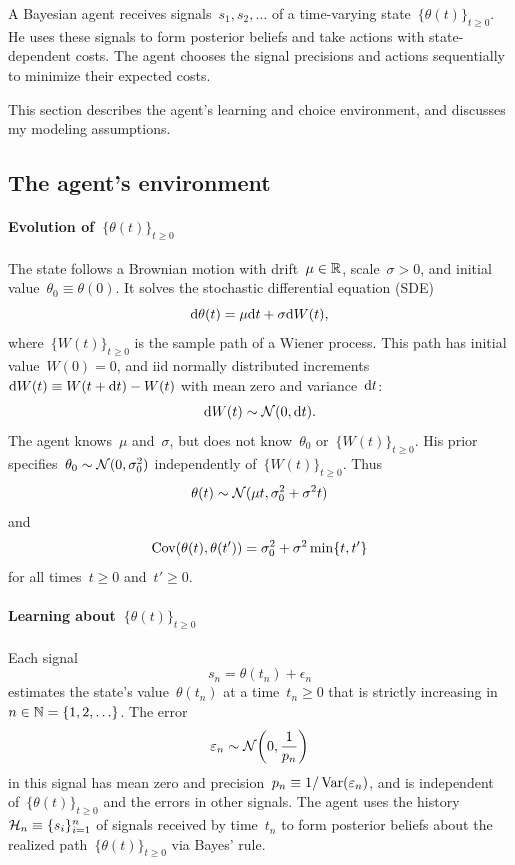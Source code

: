 \documentclass[11pt,oneside]{article}
\begin{document}
A Bayesian agent receives signals~$s_1,s_2,\ldots$ of a time-varying state~$\{\theta(t)\}_{t\ge0}$.
He uses these signals to form posterior beliefs and take actions with state-dependent costs.
The agent chooses the signal precisions and actions sequentially to minimize their expected costs.

This section describes the agent's learning and choice environment, and discusses my modeling assumptions.

\subsection{The agent's environment}

\paragraph{Evolution of~$\{\theta(t)\}_{t\ge0}$}

The state follows a Brownian motion with drift~$\mu\in\mathbb{R}$, scale~$\sigma>0$, and initial value~$\theta_0\equiv\theta(0)$.
It solves the stochastic differential equation (SDE)
%
\begin{equation}
    \mathrm{d} \theta(t)=\mu\mathrm{d} t+\sigma\mathrm{d} W(t), \label{eq:sde-brownian}
\end{equation}
%
where~$\{W(t)\}_{t\ge0}$ is the sample path of a Wiener process.
This path has initial value~$W(0)=0$, and iid normally distributed increments~$\mathrm{d} W(t)\equiv W(t+\mathrm{d} t)-W(t)$ with mean zero and variance~$\mathrm{d} t$:
\[ \mathrm{d} W(t)\sim\mathcal{N}(0,\mathrm{d} t). \]
The agent knows~$\mu$ and~$\sigma$, but does not know~$\theta_0$ or~$\{W(t)\}_{t\ge0}$.
His prior specifies~$\theta_0\sim\mathcal{N}(0,\sigma_0^2)$ independently of~$\{W(t)\}_{t\ge0}$.
Thus
\[ \theta(t)\sim\mathcal{N}(\mu t,\sigma_0^2+\sigma^2t) \]
and
%
\begin{equation}
    \operatorname{Cov}(\theta(t),\theta(t'))=\sigma_0^2+\sigma^2\min\{t,t'\} \label{eq:covariance-brownian}
\end{equation}
%
for all times~$t\ge0$ and~$t'\ge0$.

\paragraph{Learning about~$\{\theta(t)\}_{t\ge0}$}

Each signal
\[ s_n=\theta(t_n)+\epsilon_n \]
estimates the state's value~$\theta(t_n)$ at a time~$t_n\ge0$ that is strictly increasing in~$n\in\mathbb{N}=\{1,2,\ldots\}$.
The error
\[ \epsilon_n\sim\Ncal\left(0,\frac{1}{p_n}\right) \]
in this signal has mean zero and precision~$p_n\equiv1/\operatorname{Var}(\varepsilon_n)$, and is independent of~$\{\theta(t)\}_{t\ge0}$ and the errors in other signals.
The agent uses the history~$\mathcal{H}_n\equiv\{s_i\}_{i=1}^n$ of signals received by time~$t_n$ to form posterior beliefs about the realized path~$\{\theta(t)\}_{t\ge0}$ via Bayes' rule.
\end{document}
